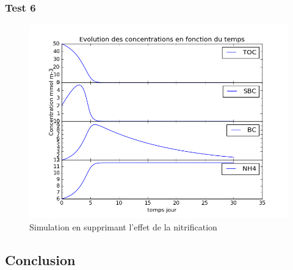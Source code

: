 \subsubsection{Test 6}

\begin{figure}[h!]
  \includegraphics[width=\textwidth]{partie1/Test6.png}
  \caption{Simulation en supprimant l'effet de la nitrification
  }
  \label{fig:partie1test6}
\end{figure}

\subsection{Conclusion}
